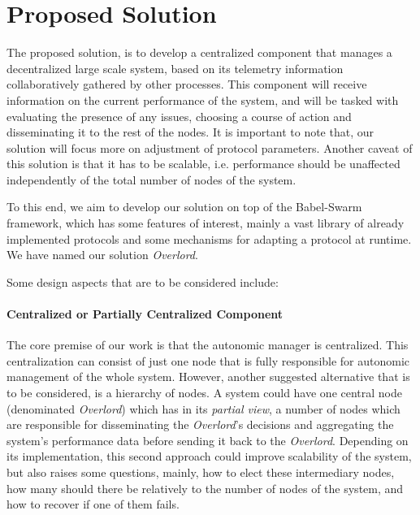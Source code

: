 \section{Proposed Solution}
\label{sec:proposed_solution}
\par The proposed solution, is to develop a centralized component that manages a decentralized large scale system, based on its telemetry information collaboratively gathered by other processes. This component will receive information on the current performance of the system, and will be tasked with evaluating the presence of any issues, choosing a course of action and disseminating it to the rest of the nodes. It is important to note that, our solution will focus more on adjustment of protocol parameters. Another caveat of this solution is that it has to be scalable, i.e. performance should be unaffected independently of the total number of nodes of the system.
\par To this end, we aim to develop our solution on top of the Babel-Swarm framework, which has some features of interest, mainly a vast library of already implemented protocols and some mechanisms for adapting a protocol at runtime. We have named our solution \textit{Overlord}.
\par Some design aspects that are to be considered include:
\paragraph{Centralized or Partially Centralized Component} The core premise of our work is that the autonomic manager is centralized. This centralization can consist of just one node that is fully responsible for autonomic management of the whole system. However, another suggested alternative that is to be considered, is a hierarchy of nodes. A system could have one central node (denominated \textit{Overlord}) which has in its \textit{partial view}, a number of nodes which are responsible for disseminating the \textit{Overlord}'s decisions and aggregating the system's performance data before sending it back to the \textit{Overlord}. Depending on its implementation, this second approach could improve scalability of the system, but also raises some questions, mainly, how to elect these intermediary nodes, how many should there be relatively to the number of nodes of the system, and how to recover if one of them fails.
